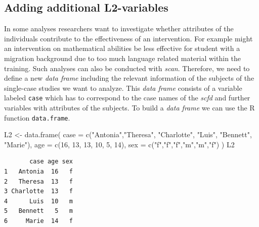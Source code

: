\documentclass[
]{book}
\newenvironment{Shaded}{\begin{snugshade}}{\end{snugshade}}
\newcommand{\AttributeTok}[1]{\textcolor[rgb]{0.77,0.63,0.00}{#1}}
\newcommand{\DecValTok}[1]{\textcolor[rgb]{0.00,0.00,0.81}{#1}}
\newcommand{\FunctionTok}[1]{\textcolor[rgb]{0.00,0.00,0.00}{#1}}
\newcommand{\NormalTok}[1]{#1}
\newcommand{\OtherTok}[1]{\textcolor[rgb]{0.56,0.35,0.01}{#1}}
\newcommand{\StringTok}[1]{\textcolor[rgb]{0.31,0.60,0.02}{#1}}
\begin{document}
\hypertarget{adding-additional-l2-variables}{%
\subsection{Adding additional L2-variables}\label{adding-additional-l2-variables}}

In some analyses researchers want to investigate whether attributes of the individuals contribute to the effectiveness of an intervention. For example might an intervention on mathematical abilities be less effective for student with a migration background due to too much language related material within the training. Such analyses can also be conducted with \emph{scan}. Therefore, we need to define a new \emph{data frame} including the relevant information of the subjects of the single-case studies we want to analyze. This \emph{data frame} consists of a variable labeled \texttt{case} which has to correspond to the case names of the \emph{scfd} and further variables with attributes of the subjects. To build a \emph{data frame} we can use the R function \texttt{data.frame}.

\begin{Shaded}
\begin{Highlighting}[]
\NormalTok{L2 }\OtherTok{\textless{}{-}} \FunctionTok{data.frame}\NormalTok{(}
  \AttributeTok{case =} \FunctionTok{c}\NormalTok{(}\StringTok{"Antonia"}\NormalTok{,}\StringTok{"Theresa"}\NormalTok{, }\StringTok{"Charlotte"}\NormalTok{, }\StringTok{"Luis"}\NormalTok{, }\StringTok{"Bennett"}\NormalTok{, }\StringTok{"Marie"}\NormalTok{), }
  \AttributeTok{age =} \FunctionTok{c}\NormalTok{(}\DecValTok{16}\NormalTok{, }\DecValTok{13}\NormalTok{, }\DecValTok{13}\NormalTok{, }\DecValTok{10}\NormalTok{, }\DecValTok{5}\NormalTok{, }\DecValTok{14}\NormalTok{), }
  \AttributeTok{sex =} \FunctionTok{c}\NormalTok{(}\StringTok{"f"}\NormalTok{,}\StringTok{"f"}\NormalTok{,}\StringTok{"f"}\NormalTok{,}\StringTok{"m"}\NormalTok{,}\StringTok{"m"}\NormalTok{,}\StringTok{"f"}\NormalTok{)}
\NormalTok{)}
\NormalTok{L2}
\end{Highlighting}
\end{Shaded}

\begin{verbatim}
       case age sex
1   Antonia  16   f
2   Theresa  13   f
3 Charlotte  13   f
4      Luis  10   m
5   Bennett   5   m
6     Marie  14   f
\end{verbatim}
\end{document}
